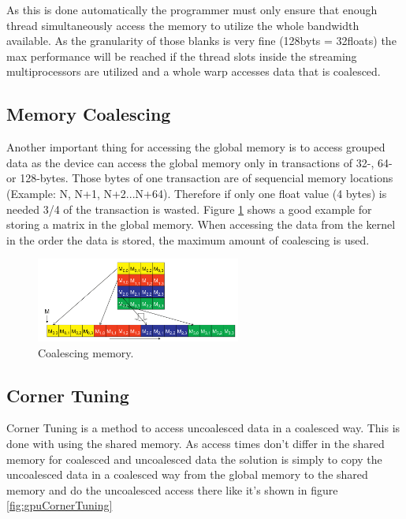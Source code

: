 As this is done automatically the programmer must only ensure that enough thread simultaneously access the memory to utilize the whole bandwidth available. As the granularity of those blanks is very fine (128byts = 32floats) the max performance will be reached if the thread slots inside the streaming multiprocessors are utilized and a whole warp accesses data that is coalesced.\\

\subsection{Memory Coalescing}
Another important thing for accessing the global memory is to access grouped data as the device can access the global memory only in transactions of 32-, 64- or 128-bytes. Those bytes of one transaction are of sequencial memory locations (Example: N, N+1, N+2...N+64). Therefore if only one float value (4 bytes) is needed 3/4 of the transaction is wasted. Figure \ref{fig:gpuCoalescing} shows a good example for storing a matrix in the global memory. When accessing the data from the kernel in the order the data is stored, the maximum amount of coalescing is used.

\begin{figure}[H]
	\centering
	\includegraphics[width=0.6\textwidth]{imgs/coalecing.png}
	\caption[Figure]{Coalescing memory. \cite[Parallel Computing Book, p. 106]{ParaComputation}}
	\label{fig:gpuCoalescing}
\end{figure}

\subsection{Corner Tuning}
Corner Tuning is a method to access uncoalesced data in a coalesced way. This is done with using the shared memory. As access times don't differ in the shared memory for coalesced and uncoalesced data the solution is simply to copy the uncoalesced data in a coalesced way from the global memory to the shared memory and do the uncoalesced access there like it's shown in figure \ref{fig:gpuCornerTuning}

